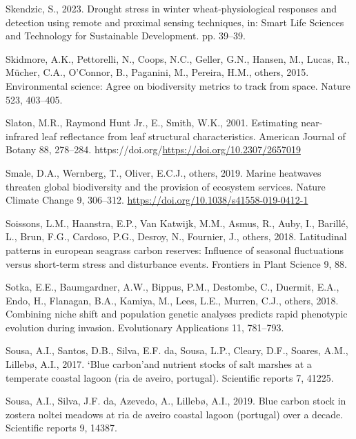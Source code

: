 \documentclass[
  letterpaper,
  11pt,
  english,
  singlespacing,
  headsepline]{MastersDoctoralThesis}
\newlength{\cslhangindent}
\newenvironment{CSLReferences}[2] %
 {\begin{list}{}{%
  \setlength{\itemindent}{0pt}
  \setlength{\leftmargin}{0pt}
  \setlength{\parsep}{0pt}
  \ifodd #1
   \setlength{\leftmargin}{\cslhangindent}
   \setlength{\itemindent}{-1\cslhangindent}
  \fi
  \setlength{\itemsep}{#2\baselineskip}}}
 {\end{list}}
\begin{document}
\begin{CSLReferences}{1}{0}
Skendzic, S., 2023. Drought stress in winter wheat-physiological
responses and detection using remote and proximal sensing techniques,
in: Smart Life Sciences and Technology for Sustainable Development. pp.
39--39.

Skidmore, A.K., Pettorelli, N., Coops, N.C., Geller, G.N., Hansen, M.,
Lucas, R., Mücher, C.A., O'Connor, B., Paganini, M., Pereira, H.M.,
others, 2015. Environmental science: Agree on biodiversity metrics to
track from space. Nature 523, 403--405.

Slaton, M.R., Raymond Hunt Jr., E., Smith, W.K., 2001. Estimating
near-infrared leaf reflectance from leaf structural characteristics.
American Journal of Botany 88, 278--284.
https://doi.org/\url{https://doi.org/10.2307/2657019}

Smale, D.A., Wernberg, T., Oliver, E.C.J., others, 2019. Marine
heatwaves threaten global biodiversity and the provision of ecosystem
services. Nature Climate Change 9, 306--312.
\url{https://doi.org/10.1038/s41558-019-0412-1}

Soissons, L.M., Haanstra, E.P., Van Katwijk, M.M., Asmus, R., Auby, I.,
Barillé, L., Brun, F.G., Cardoso, P.G., Desroy, N., Fournier, J.,
others, 2018. Latitudinal patterns in european seagrass carbon reserves:
Influence of seasonal fluctuations versus short-term stress and
disturbance events. Frontiers in Plant Science 9, 88.

Sotka, E.E., Baumgardner, A.W., Bippus, P.M., Destombe, C., Duermit,
E.A., Endo, H., Flanagan, B.A., Kamiya, M., Lees, L.E., Murren, C.J.,
others, 2018. Combining niche shift and population genetic analyses
predicts rapid phenotypic evolution during invasion. Evolutionary
Applications 11, 781--793.

Sousa, A.I., Santos, D.B., Silva, E.F. da, Sousa, L.P., Cleary, D.F.,
Soares, A.M., Lillebø, A.I., 2017. `Blue carbon'and nutrient stocks of
salt marshes at a temperate coastal lagoon (ria de aveiro, portugal).
Scientific reports 7, 41225.

Sousa, A.I., Silva, J.F. da, Azevedo, A., Lillebø, A.I., 2019. Blue
carbon stock in zostera noltei meadows at ria de aveiro coastal lagoon
(portugal) over a decade. Scientific reports 9, 14387.


\end{CSLReferences}
\end{document}
